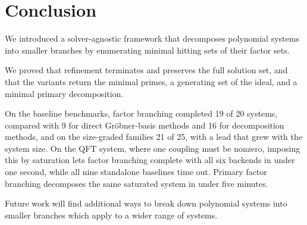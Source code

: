 \section{Conclusion}
\label{sec:conclusion}

We introduced a solver-agnostic framework that decomposes polynomial systems
into smaller branches by enumerating minimal hitting sets of their factor sets.

We proved that refinement terminates and preserves the full solution set, and
that the variants return the minimal primes, a generating set of the ideal,
and a minimal primary decomposition.

On the baseline benchmarks, factor branching completed 19 of 20
systems, compared with
9 for direct Gr\"obner-basis methods and 16 for decomposition
methods, and on the size-graded families 21 of 25, with a lead that grew with
the system size. On the QFT system, where one coupling must be nonzero,
imposing this by
saturation lets factor branching complete with all six
backends in under one second, while all nine standalone baselines
time out. Primary factor branching decomposes the same saturated system in
under five minutes.

Future work will find additional ways to break down polynomial systems into smaller branches which apply to a wider range of systems.
